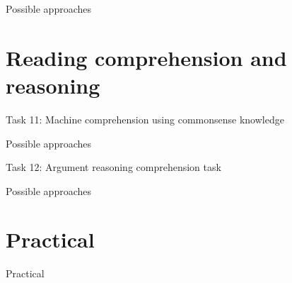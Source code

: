 \documentclass[10pt, compress]{beamer}
\begin{document}
\begin{frame}{Possible approaches}


\end{frame}

\section{Reading comprehension and reasoning}

\begin{frame}{Task 11: Machine comprehension using commonsense knowledge}


\end{frame}

\begin{frame}{Possible approaches}


\end{frame}

\begin{frame}{Task 12: Argument reasoning comprehension task}


\end{frame}

\begin{frame}{Possible approaches}


\end{frame}

\section{Practical}

\begin{frame}{Practical}


\end{frame}
\end{document}
